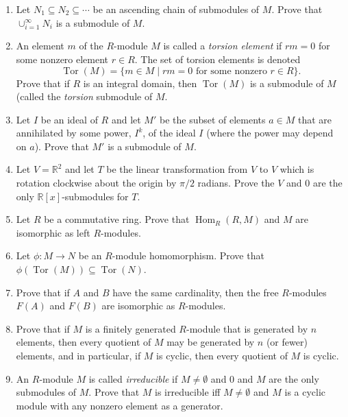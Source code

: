 \documentclass[11pt]{scrartcl}
\theoremstyle{definition}
\DeclareMathOperator{\Tor}{Tor}
\DeclareMathOperator{\Hom}{Hom}
\begin{document}
\begin{enumerate}
\item Let $N_1\subseteq N_2\subseteq \cdots $ be an ascending chain of submodules of $M$. Prove that $\cup_{i=1}^{\infty}N_i$ is a submodule of $M$.
\item An element $m$ of the $R$-module $M$ is called a \emph{torsion element} if $rm=0$ for some nonzero element $r\in R$. The set of torsion elements is denoted
\[
\Tor(M)=\{m\in M\mid rm=0\text{ for some nonzero }r\in R\}.
\]
Prove that if $R$ is an integral domain, then $\Tor(M)$ is a submodule of $M$ (called the \emph{torsion} submodule of $M$.
\item Let $I$ be an ideal of $R$ and let $M'$ be the subset of elements $a\in M$ that are annihilated by some power, $I^k$, of the ideal $I$ (where the power may depend on $a$). Prove that $M'$ is a submodule of $M$.
\item Let $V=\mathbb{R}^2$ and let $T$ be the linear transformation from $V$ to $V$ which is rotation clockwise about the origin by $\pi/2$ radians.  Prove the $V$ and $0$ are the only $\mathbb{R}[x]$-submodules for $T$.
\item Let $R$ be a commutative ring. Prove that $\Hom_R(R,M)$ and $M$ are isomorphic as left $R$-modules.
\item Let $\phi:M\to N$ be an $R$-module homomorphism. Prove that $\phi(\Tor(M))\subseteq \Tor(N)$.
\item Prove that if $A$ and $B$ have the same cardinality, then the free $R$-modules $F(A)$ and $F(B)$ are isomorphic as $R$-modules.
\item Prove that if $M$ is a finitely generated $R$-module that is generated by $n$ elements, then every quotient of $M$ may be generated by $n$ (or fewer) elements, and in particular, if $M$ is cyclic, then every quotient of $M$ is cyclic.
\item An $R$-module $M$ is called \emph{irreducible} if $M\neq \emptyset$ and $0$ and $M$ are the only submodules of $M$. Prove that $M$ is irreducible iff $M\neq \emptyset$ and $M$ is a cyclic module with any nonzero element as a generator.
\end{enumerate}
\end{document}

